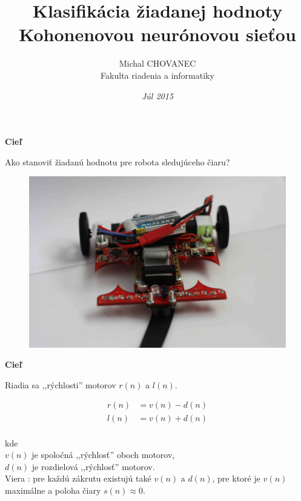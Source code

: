 \documentclass[xcolor=dvipsnames]{beamer}
\title{\bf Klasifikácia žiadanej hodnoty Kohonenovou neurónovou sieťou}
\author{Michal CHOVANEC \\Fakulta riadenia a informatiky}
\date[EURP]{\it Júl 2015}
\begin{document}
\begin{frame}
\titlepage
\end{frame}

\begin{frame}{\bf Cieľ}

Ako stanoviť žiadanú hodnotu pre robota sledujúceho čiaru?

\begin{figure}[ht]
\begin{center}
\begin{minipage}{0.6\linewidth}
\begin{center}
\includegraphics[width=1.0\textwidth]{images/motoko_aftermath_front.jpg}
\end{center}
\end{minipage}
\end{center}
\end{figure}

\end{frame}

\begin{frame}{\bf Cieľ}

Riadia sa ,,rýchlosti'' motorov $r(n)$ a $l(n)$.

\begin{align}
\label{eq_basic_robot}
 r(n) &= v(n) - d(n) \nonumber \\
 l(n) &= v(n) + d(n) \nonumber \\
\end{align}

kde \\
$v(n)$ je spoločná ,,rýchlosť'' oboch motorov, \\
$d(n)$ je rozdielová ,,rýchlosť'' motorov. \\
Viera : pre každú zákrutu existujú také  $v(n)$ a $d(n)$, pre ktoré je
$v(n)$ maximálne a poloha čiary $s(n) \approx 0$.

\end{frame}
\end{document}
